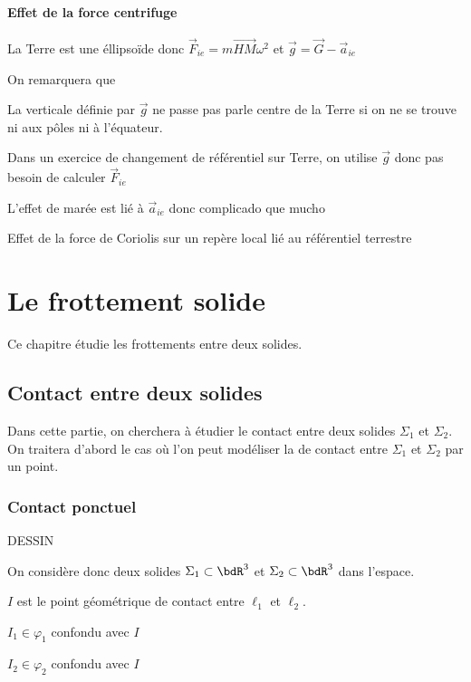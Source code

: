     \subsubsection{Effet de la force centrifuge}

    La Terre est une éllipsoïde donc \(\vec F_{ie} = m \vec{HM}\omega^2\) et \(\vec g = \vec G - \vec a_{ie}\)

    On remarquera que 
    \begin{enumerate}
        \itt La verticale définie par \(\vec g\) ne passe pas parle centre de la Terre si on ne se trouve ni aux pôles ni à l'équateur.

        \itt Dans un exercice de changement de référentiel sur Terre, on utilise \(\vec g\) donc pas besoin de calculer \(\vec F_{ie}\)

        \itt L'effet de marée est lié à \(\vec a_{ie}\) donc complicado que mucho

        \itt Effet de la force de Coriolis sur un repère local lié au référentiel terrestre
    \end{enumerate}

    \chapter{Le frottement solide}
    
    Ce chapitre étudie les frottements entre deux solides.
    
    \chaptertoc
    
    \section{Contact entre deux solides}
    
    Dans cette partie, on cherchera à étudier le contact entre deux solides
    $\Sigma_1$ et $\Sigma_2$. On traitera d'abord le cas où l'on peut
    modéliser la  de contact entre $\Sigma_1$ et $\Sigma_2$ par
    un point.
    
    \subsection{Contact ponctuel}
    
    \begin{minipage}{0.48\linewidth}
        DESSIN
    \end{minipage}
    \hfill
    \begin{minipage}{0.48\linewidth}
        On considère donc deux solides $\Sigma_1 \subset \bdR^3$ et $\Sigma_2 \subset \bdR^3$ dans l'espace. 
        \begin{enumerate}
            \itt $I$ est le point géométrique de contact entre $\ell_1$ et $\ell_2$. 
            
            \itt $I_1 \in \varphi_1$ confondu avec $I$
            
            \itt $I_2 \in \varphi_2$ confondu avec $I$
        \end{enumerate}
    \end{minipage}
    
